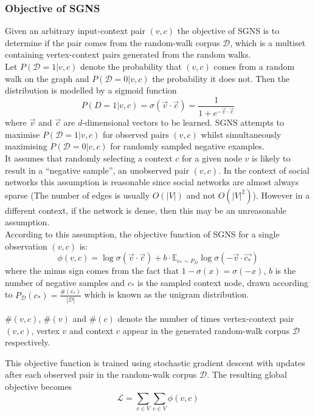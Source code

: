 \documentclass[a4paper]{article}
\renewcommand{\E}{\mathbb E}
\newcommand{\D}{\mathcal D}
\begin{document}
\subsubsection{Objective of SGNS}
Given an arbitrary input-context pair $(v,c)$ the objective of SGNS is to determine if
the pair comes from the random-walk corpus $\mathcal{D}$, which is a multiset containing vertex-context pairs generated from the random walks.\\
Let $P(\D = 1 | v, c)$ denote the probability that $(v,c)$ comes from a random
walk on the graph and $P(\D = 0| v, c)$
the probability it does not. Then the distribution is modelled by a sigmoid
function
\[P(D = 1 | v, c) = \sigma(\vec{v} \cdot \vec{c}) = \frac{1}{1 + e^{-\vec{v} \cdot \vec{c}}}\]
where $\vec{v}$ and $\vec{c}$ are $d$-dimensional vectors to be learned. SGNS attempts to maximise $P(\mathcal{D} = 1 | v,c)$ for observed pairs $(v, c)$
whilst simultaneously maximising $P(\D = 0 | v, c)$ for randomly sampled
negative examples.\\
It assumes that randomly selecting a context $c$ for a given
node $v$ is likely to result in a ``negative sample'', an unobserved pair $(v,c)$. In the context of
social networks this assumption is reasonable since social networks are almost
always sparse (The number of edges is usually $O(|V|)$ and not $O(|V|^2)$). However in a different
context, if the network is dense, then this may be an unreasonable assumption.\\
According to this assumption, the objective function of SGNS for a single
observation $(v,c)$ is:
\[\phi(v, c) = \log{\sigma(\vec{v} \cdot \vec{c})} + b \cdot \E_{c_* \sim P_D}\log{\sigma(-\vec{v} \cdot \vec{c_*})}\]
where the minus sign comes from the fact that $1 - \sigma(x) = \sigma(-x)$, $b$
is the number of negative samples and $c_*$ is the sampled context node, drawn
according to $P_{\D} (c_*) = \frac{\#(c_*)}{| \D |}$ which is known as the unigram
distribution.\\
\begin{notation} $\#(v,c)$, $\#(v)$ and $\#(c)$ denote the number of times vertex-context pair
  $(v,c)$, vertex $v$ and context $c$ appear in the generated random-walk corpus
  $\mathcal{D}$ respectively.
\end{notation}
\noindent This objective function is trained using stochastic gradient descent with
updates after each  observed pair in the random-walk corpus $\D$. The resulting
global objective becomes
\begin{equation*}
  \mathcal{L} = \sum_{v \in V} \sum_{c \in V} \phi(v, c)
\end{equation*}
\end{document}
